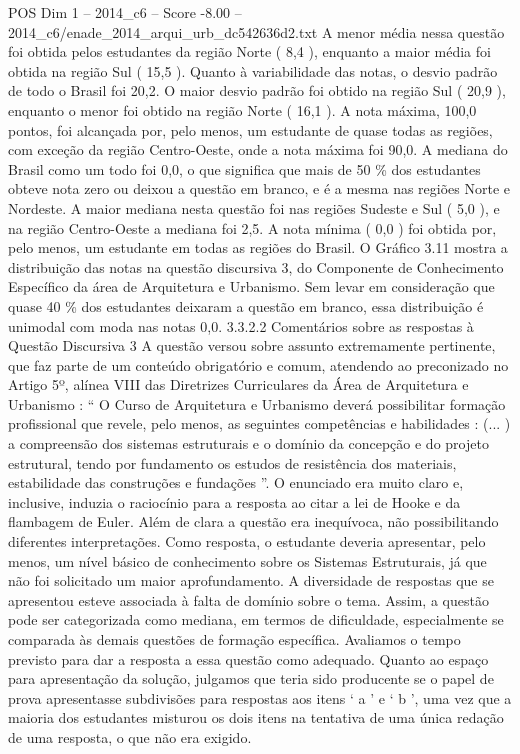 \begin{textsample}{POS Dim 1 – 2014\_c6 – Score -8.00 – 2014\_c6/enade\_2014\_arqui\_urb\_dc542636d2.txt}
A menor média nessa questão foi obtida pelos estudantes da região Norte ( 8,4 ), enquanto a maior média foi obtida na região Sul ( 15,5 ).
Quanto à variabilidade das notas, o desvio padrão de todo o Brasil foi 20,2.
O maior desvio padrão foi obtido na região Sul ( 20,9 ), enquanto o menor foi obtido na região Norte ( 16,1 ).
A nota máxima, 100,0 pontos, foi alcançada por, pelo menos, um estudante de quase todas as regiões, com exceção da região Centro-Oeste, onde a nota máxima foi 90,0.
A mediana do Brasil como um todo foi 0,0, o que significa que mais de 50 \% dos estudantes obteve nota zero ou deixou a questão em branco, e é a mesma nas regiões Norte e Nordeste.
A maior mediana nesta questão foi nas regiões Sudeste e Sul ( 5,0 ), e na região Centro-Oeste a mediana foi 2,5.
A nota mínima ( 0,0 ) foi obtida por, pelo menos, um estudante em todas as regiões do Brasil.
O Gráfico 3.11 mostra a distribuição das notas na questão discursiva 3, do Componente de Conhecimento Específico da área de Arquitetura e Urbanismo.
Sem levar em consideração que quase 40 \% dos estudantes deixaram a questão em branco, essa distribuição é unimodal com moda nas notas 0,0. 3.3.2.2 Comentários sobre as respostas à Questão Discursiva 3 A questão versou sobre assunto extremamente pertinente, que faz parte de um conteúdo obrigatório e comum, atendendo ao preconizado no Artigo 5º, alínea VIII das Diretrizes Curriculares da Área de Arquitetura e Urbanismo : “ O Curso de Arquitetura e Urbanismo deverá possibilitar formação profissional que revele, pelo menos, as seguintes competências e habilidades : (... ) a compreensão dos sistemas estruturais e o domínio da concepção e do projeto estrutural, tendo por fundamento os estudos de resistência dos materiais, estabilidade das construções e fundações ”.
O enunciado era muito claro e, inclusive, induzia o raciocínio para a resposta ao citar a lei de Hooke e da flambagem de Euler.
Além de clara a questão era inequívoca, não possibilitando diferentes interpretações.
Como resposta, o estudante deveria apresentar, pelo menos, um nível básico de conhecimento sobre os Sistemas Estruturais, já que não foi solicitado um maior aprofundamento.
A diversidade de respostas que se apresentou esteve associada à falta de domínio sobre o tema.
Assim, a questão pode ser categorizada como mediana, em termos de dificuldade, especialmente se comparada às demais questões de formação específica.
Avaliamos o tempo previsto para dar a resposta a essa questão como adequado.
Quanto ao espaço para apresentação da solução, julgamos que teria sido producente se o papel de prova apresentasse subdivisões para respostas aos itens ‘ a ’ e ‘ b ’, uma vez que a maioria dos estudantes misturou os dois itens na tentativa de uma única redação de uma resposta, o que não era exigido.

\end{textsample}
